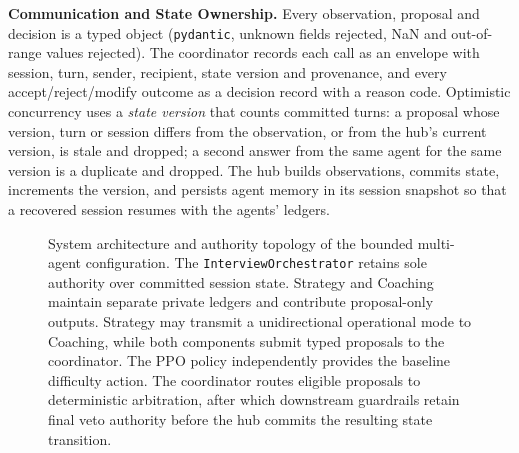 \noindent\textbf{Communication and State Ownership.}\label{sec:comm}
Every observation, proposal and decision is a typed object (\texttt{pydantic}, unknown fields rejected, NaN and out-of-range values rejected). The coordinator records each call as an envelope with session, turn, sender, recipient, state version and provenance, and every accept/reject/modify outcome as a decision record with a reason code. Optimistic concurrency uses a \emph{state version} that counts committed turns: a proposal whose version, turn or session differs from the observation, or from the hub's current version, is stale and dropped; a second answer from the same agent for the same version is a duplicate and dropped. The hub builds observations, commits state, increments the version, and persists agent memory in its session snapshot so that a recovered session resumes with the agents' ledgers.

\begin{figure}[tbp]
\centering
\resizebox{0.70\textwidth}{!}{}
\caption{System architecture and authority topology of the bounded multi-agent configuration. The \texttt{InterviewOrchestrator} retains sole authority over committed session state. Strategy and Coaching maintain separate private ledgers and contribute proposal-only outputs. Strategy may transmit a unidirectional operational mode to Coaching, while both components submit typed proposals to the coordinator. The PPO policy independently provides the baseline difficulty action. The coordinator routes eligible proposals to deterministic arbitration, after which downstream guardrails retain final veto authority before the hub commits the resulting state transition.}\label{fig:arch}
\end{figure}

